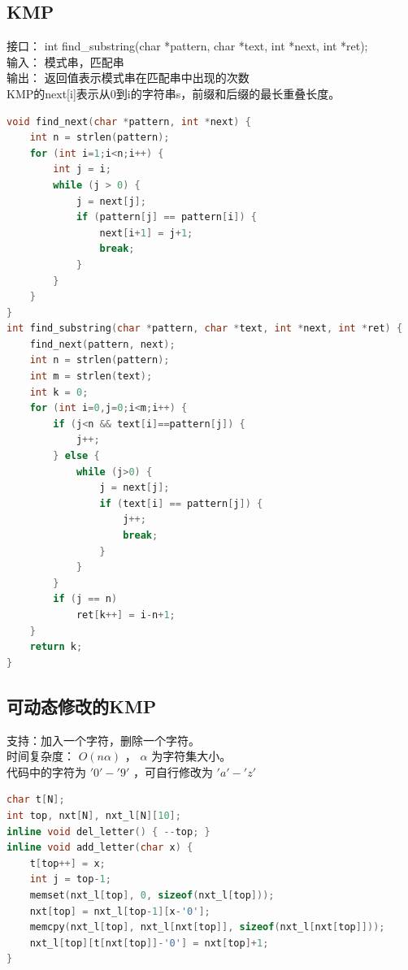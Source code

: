 \documentclass{article}
\begin{document}
\subsection{KMP}
接口： int find\_substring(char *pattern, char *text, int *next, int *ret); \\
输入： 模式串，匹配串 \\
输出： 返回值表示模式串在匹配串中出现的次数 \\
KMP的next[i]表示从0到i的字符串s，前缀和后缀的最长重叠长度。
\begin{lstlisting}[language=C++]
void find_next(char *pattern, int *next) {
	int n = strlen(pattern);
	for (int i=1;i<n;i++) {
		int j = i;
		while (j > 0) {
			j = next[j];
			if (pattern[j] == pattern[i]) {
				next[i+1] = j+1;
				break;
			}
		}
	}
}
int find_substring(char *pattern, char *text, int *next, int *ret) {
	find_next(pattern, next);
	int n = strlen(pattern);
	int m = strlen(text);
	int k = 0;
	for (int i=0,j=0;i<m;i++) {
		if (j<n && text[i]==pattern[j]) {
			j++;
		} else {
			while (j>0) {
				j = next[j];
				if (text[i] == pattern[j]) {
					j++;
					break;
				}
			}
		}
		if (j == n)
			ret[k++] = i-n+1;
	}
	return k;
}
\end{lstlisting}
\subsection{可动态修改的KMP}
支持：加入一个字符，删除一个字符。\\
时间复杂度： $O(n \alpha)$ ， $\alpha$ 为字符集大小。\\
代码中的字符为 $'0' - '9'$ ，可自行修改为 $'a' - 'z'$
\begin{lstlisting}[language=C++]
char t[N];
int top, nxt[N], nxt_l[N][10];
inline void del_letter() { --top; }
inline void add_letter(char x) {
	t[top++] = x;
	int j = top-1;
	memset(nxt_l[top], 0, sizeof(nxt_l[top]));
	nxt[top] = nxt_l[top-1][x-'0'];
	memcpy(nxt_l[top], nxt_l[nxt[top]], sizeof(nxt_l[nxt[top]]));
	nxt_l[top][t[nxt[top]]-'0'] = nxt[top]+1;
}
\end{lstlisting}
\end{document}
